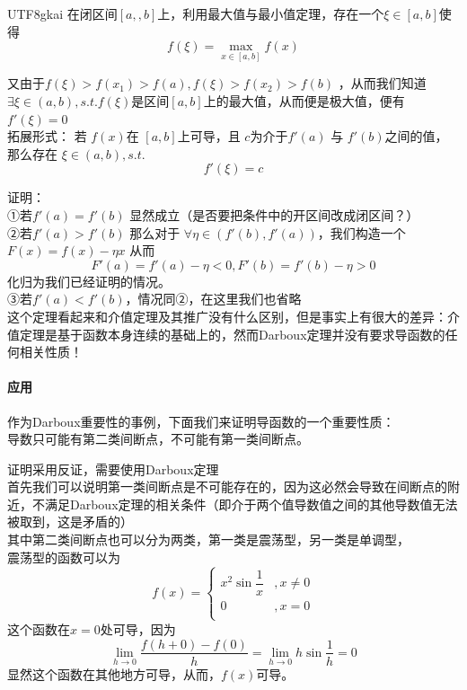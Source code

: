 \documentclass{article}
\begin{document}
\begin{CJK}{UTF8}{gkai}
在闭区间$[a,,b]$上，利用最大值与最小值定理，存在一个$\xi\in [a,b]$使得 
\[f(\xi) = \max_{x\in [a,b]}f(x)\]

又由于$f(\xi) > f(x_1) > f(a), f(\xi) > f(x_2) > f(b)$ ，从而我们知道$\exists \xi\in (a,b),s.t. f(\xi)$是区间$[a,b]$上的最大值，从而便是极大值，便有$f'(\xi) = 0$\\

拓展形式：
若 $f(x)$在 $[a,b]$上可导，且 $c$为介于$f'(a)$ 与 $f'(b)$之间的值，那么存在 $\xi \in (a,b),s.t.$
\[f'(\xi) = c\]

证明：\\
①若$f'(a) = f'(b)$ 显然成立（是否要把条件中的开区间改成闭区间？）\\
②若$f'(a) > f'(b)$ 那么对于 $\forall \eta\in (f'(b),f'(a))$，我们构造一个 $F(x) =  f(x) - \eta x$
从而
\[F'(a) = f'(a) - \eta < 0 , F'(b) = f'(b) - \eta > 0 \]
化归为我们已经证明的情况。\\
③若$f'(a) < f'(b)$，情况同②，在这里我们也省略\\


这个定理看起来和介值定理及其推广没有什么区别，但是事实上有很大的差异：介值定理是基于函数本身连续的基础上的，然而Darboux定理并没有要求导函数的任何相关性质！\\

\paragraph{应用\\} 
作为Darboux重要性的事例，下面我们来证明导函数的一个重要性质：\\

导数只可能有第二类间断点，不可能有第一类间断点。

证明采用反证，需要使用Darboux定理\\
首先我们可以说明第一类间断点是不可能存在的，因为这必然会导致在间断点的附近，不满足Darboux定理的相关条件（即介于两个值导数值之间的其他导数值无法被取到，这是矛盾的）\\
其中第二类间断点也可以分为两类，第一类是震荡型，另一类是单调型，\\
震荡型的函数可以为
\begin{equation}
f(x) =  
\begin{cases}
x^{2}\sin \dfrac{1}{x} &,x\neq 0\\
0 &, x=0\\
\end{cases}
\end{equation}
这个函数在$x=0$处可导，因为
\[\lim_{h\to 0}\dfrac{f(h+0)-f(0)}{h}=\lim_{h\to 0}h\sin\frac{1}{h} = 0\]
显然这个函数在其他地方可导，从而，$f(x)$可导。\\


\end{CJK}
\end{document}
